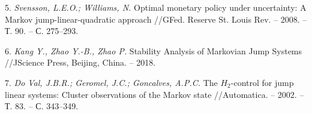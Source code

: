 5. {\it Svensson, L.E.O.; Williams, N. }
 Optimal monetary policy under uncertainty: A Markov jump-linear-quadratic approach //GFed. Reserve St. Louis Rev. – 2008. – Т. 90. – С. 275–293.

6. {\it Kang Y., Zhao Y.-B., Zhao P. }
 Stability Analysis of Markovian Jump Systems //JScience Press, Beijing, China. – 2018.

7. {\it Do Val, J.B.R.; Geromel, J.C.; Goncalves, A.P.C.}
 The $H_2$-control for jump linear systems: Cluster observations of the Markov state //Automatica. – 2002. – Т. 83. – С. 343–349.


